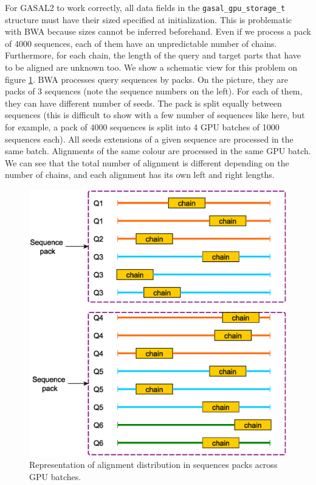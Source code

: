 For GASAL2 to work correctly, all data fields in the \texttt{gasal\_gpu\_storage\_t} structure must have their sized specified at initialization. This is problematic with BWA because sizes cannot be inferred beforehand. Even if we process a pack of 4000 sequences, each of them have an unpredictable number of chains. Furthermore, for each chain, the length of the query and target parts that have to be aligned are unknown too. We show a schematic view for this problem on figure \ref{fig:cpu-gpu-batches}. BWA processes query sequences by packs. On the picture, they are packs of 3 sequences (note the sequence numbers on the left). For each of them, they can have different number of seeds. The pack is split equally between sequences (this is difficult to show with a few number of sequences like here, but for example, a pack of 4000 sequences is split into 4 GPU batches of 1000 sequences each). All seeds extensions of a given sequence are processed in the same batch. Alignments of the same colour are processed in the same GPU batch. We can see that the total number of alignment is different depending on the number of chains, and each alignment has its own left and right lengths.

\begin{figure}[h!]
	\centering
	\includegraphics[width=1\linewidth]{cpu-gpu-batches}
	\caption{Representation of alignment distribution in sequences packs across GPU batches.}
	\label{fig:cpu-gpu-batches}
\end{figure}



